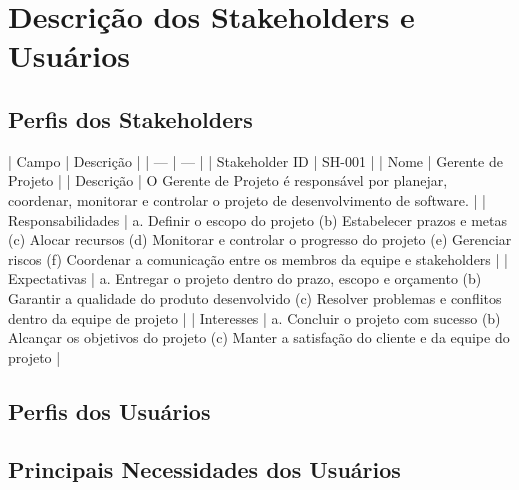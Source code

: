 \chapter{Descrição dos Stakeholders e Usuários}

\section{Perfis dos Stakeholders}

| Campo | Descrição |
| --- | --- |
| Stakeholder ID | SH-001 |
| Nome | Gerente de Projeto |
| Descrição | O Gerente de Projeto é responsável por planejar, coordenar, monitorar e controlar o projeto de desenvolvimento de software. |
| Responsabilidades | a. Definir o escopo do projeto (b) Estabelecer prazos e metas (c) Alocar recursos (d) Monitorar e controlar o progresso do projeto (e) Gerenciar riscos (f) Coordenar a comunicação entre os membros da equipe e stakeholders |
| Expectativas | a. Entregar o projeto dentro do prazo, escopo e orçamento (b) Garantir a qualidade do produto desenvolvido (c) Resolver problemas e conflitos dentro da equipe de projeto |
| Interesses | a. Concluir o projeto com sucesso (b) Alcançar os objetivos do projeto (c) Manter a satisfação do cliente e da equipe do projeto |

\section{Perfis dos Usuários}
\section{Principais Necessidades dos Usuários}
